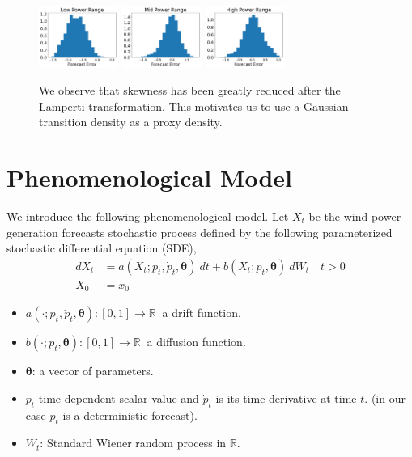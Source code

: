 \documentclass[10pt,twocolumn,letterpaper]{article}
\newcommand{\R}{\mathbb{R}}
\begin{document}
\begin{figure}
  \includegraphics[width=26mm,scale=1]{plots/hist_low_lamperti.pdf}
  \includegraphics[width=26mm,scale=1]{plots/hist_mid_lamperti.pdf}
  \includegraphics[width=26mm,scale=1]{plots/hist_high_lamperti.pdf}
  \caption{We observe that skewness has been greatly reduced after the Lamperti transformation. This motivates us to use a Gaussian transition density as a proxy density.}
  \label{fig:skew_after_lamperti}
\end{figure}

\section{Phenomenological  Model} \label{Section_2}

We introduce the following phenomenological model. Let $X_t$ be the  wind power generation forecasts stochastic process defined by the  following parameterized stochastic differential equation (SDE),
\begin{equation}
\begin{split}
dX_t &= a(X_t; p_t, \dot{p}_t,\bm{\theta}) \ dt + b (X_t;p_t, \bm{\theta} ) \ dW_t \quad t > 0 \\
X_0 & = x_0
\end{split}
\label{main}
\end{equation}

\begin{itemize}
\item $a(\cdot; p_t, \dot{p}_t,\bm{\theta}):[0,1] \to \R \ $  a drift function.
\item $b (\cdot;p_t, \bm{\theta} ):[0,1] \to \R \ $  a  diffusion function.
\item $\bm{\theta}$: a vector of parameters.
\item $p_t$ time-dependent scalar value and $ \dot{p}_t$ is its time derivative at time $t$. (in our case  $p_t$ is a deterministic forecast).
\item $W_t$: Standard Wiener random process in $\R$.
\end{itemize}
\end{document}
